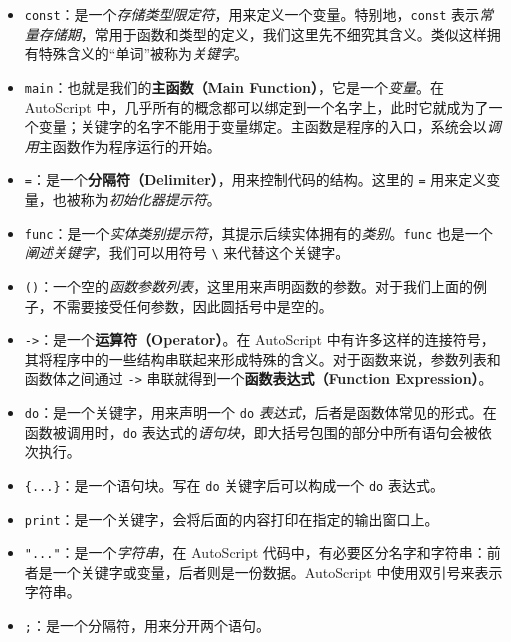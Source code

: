 \begin{itemize}
    \item \lstinline!const!：是一个\emph{存储类型限定符}，用来定义一个变量。特别地，\lstinline!const! 表示\emph{常量存储期}，常用于函数和类型的定义，我们这里先不细究其含义。类似这样拥有特殊含义的“单词”被称为\emph{关键字}。

    \item \lstinline!main!：也就是我们的\textbf{主函数（Main Function）}，它是一个\emph{变量}。在 AutoScript 中，几乎所有的概念都可以绑定到一个名字上，此时它就成为了一个变量；关键字的名字不能用于变量绑定。主函数是程序的入口，系统会以\emph{调用}主函数作为程序运行的开始。

    \item \lstinline!=!：是一个\textbf{分隔符（Delimiter）}，用来控制代码的结构。这里的 \lstinline!=! 用来定义变量，也被称为\emph{初始化器提示符}。

    \item \lstinline!func!：是一个\emph{实体类别提示符}，其提示后续实体拥有的\emph{类别}。\lstinline!func! 也是一个\emph{阐述关键字}，我们可以用符号 \lstinline!\! 来代替这个关键字。

    \item \lstinline!()!：一个空的\emph{函数参数列表}，这里用来声明函数的参数。对于我们上面的例子，不需要接受任何参数，因此圆括号中是空的。

    \item \lstinline!->!：是一个\textbf{运算符（Operator）}。在 AutoScript 中有许多这样的连接符号，其将程序中的一些结构串联起来形成特殊的含义。对于函数来说，参数列表和函数体之间通过 \lstinline!->! 串联就得到一个\textbf{函数表达式（Function Expression）}。

    \item \lstinline!do!：是一个关键字，用来声明一个 \lstinline!do! \emph{表达式}，后者是函数体常见的形式。在函数被调用时，\lstinline!do! 表达式的\emph{语句块}，即大括号包围的部分中所有语句会被依次执行。

    \item \lstinline!{...}!：是一个语句块。写在 \lstinline!do! 关键字后可以构成一个 \lstinline!do! 表达式。

    \item \lstinline!print!：是一个关键字，会将后面的内容打印在指定的输出窗口上。

    \item \lstinline!"..."!：是一个\emph{字符串}，在 AutoScript 代码中，有必要区分名字和字符串：前者是一个关键字或变量，后者则是一份数据。AutoScript 中使用双引号来表示字符串。

    \item \lstinline!;!：是一个分隔符，用来分开两个语句。
\end{itemize}

